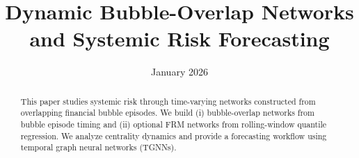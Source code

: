 \documentclass[preprint,12pt,authoryear]{elsarticle}
\title{Dynamic Bubble-Overlap Networks and Systemic Risk Forecasting}
\date{January 2026}
\begin{document}
\maketitle

\begin{abstract}
This paper studies systemic risk through time-varying networks constructed from overlapping financial bubble episodes.
We build (i) bubble-overlap networks from bubble episode timing and (ii) optional FRM networks from rolling-window quantile regression.
We analyze centrality dynamics and provide a forecasting workflow using temporal graph neural networks (TGNNs).
\end{abstract}








\appendix




\end{document}
